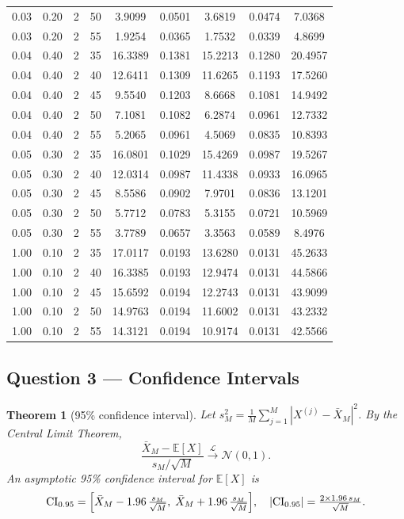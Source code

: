 \documentclass[11pt,a4paper]{article}
\theoremstyle{plain}
\newtheorem{theorem}{Theorem}[section]
\theoremstyle{definition}
\newcommand{\E}{\mathbb{E}}
\begin{document}
\begin{table}[H]
\begin{tabular}{cccc|cc|cc|c}
    0.03 & 0.20 & 2 & 50 &  3.9099 & 0.0501 &  3.6819 & 0.0474 &  7.0368 \\
    0.03 & 0.20 & 2 & 55 &  1.9254 & 0.0365 &  1.7532 & 0.0339 &  4.8699 \\
    \midrule
    0.04 & 0.40 & 2 & 35 & 16.3389 & 0.1381 & 15.2213 & 0.1280 & 20.4957 \\
    0.04 & 0.40 & 2 & 40 & 12.6411 & 0.1309 & 11.6265 & 0.1193 & 17.5260 \\
    0.04 & 0.40 & 2 & 45 &  9.5540 & 0.1203 &  8.6668 & 0.1081 & 14.9492 \\
    0.04 & 0.40 & 2 & 50 &  7.1081 & 0.1082 &  6.2874 & 0.0961 & 12.7332 \\
    0.04 & 0.40 & 2 & 55 &  5.2065 & 0.0961 &  4.5069 & 0.0835 & 10.8393 \\
    \midrule
    0.05 & 0.30 & 2 & 35 & 16.0801 & 0.1029 & 15.4269 & 0.0987 & 19.5267 \\
    0.05 & 0.30 & 2 & 40 & 12.0314 & 0.0987 & 11.4338 & 0.0933 & 16.0965 \\
    0.05 & 0.30 & 2 & 45 &  8.5586 & 0.0902 &  7.9701 & 0.0836 & 13.1201 \\
    0.05 & 0.30 & 2 & 50 &  5.7712 & 0.0783 &  5.3155 & 0.0721 & 10.5969 \\
    0.05 & 0.30 & 2 & 55 &  3.7789 & 0.0657 &  3.3563 & 0.0589 &  8.4976 \\
    \midrule
    1.00 & 0.10 & 2 & 35 & 17.0117 & 0.0193 & 13.6280 & 0.0131 & 45.2633 \\
    1.00 & 0.10 & 2 & 40 & 16.3385 & 0.0193 & 12.9474 & 0.0131 & 44.5866 \\
    1.00 & 0.10 & 2 & 45 & 15.6592 & 0.0194 & 12.2743 & 0.0131 & 43.9099 \\
    1.00 & 0.10 & 2 & 50 & 14.9763 & 0.0194 & 11.6002 & 0.0131 & 43.2332 \\
    1.00 & 0.10 & 2 & 55 & 14.3121 & 0.0194 & 10.9174 & 0.0131 & 42.5566 \\
    \bottomrule
  \end{tabular}
\end{table}

\subsection{Question 3 --- Confidence Intervals}
\label{subsec:q3}

\begin{theorem}[95\% confidence interval]
\label{thm:ci}
Let $s_M^2 = \frac{1}{M}\sum_{j=1}^M |X^{(j)}-\bar{X}_M|^2$.
By the Central Limit Theorem,
\[
  \frac{\bar{X}_M - \E[X]}{s_M/\sqrt{M}} \xrightarrow{\mathcal{L}}
  \mathcal{N}(0,1).
\]
An asymptotic 95\% confidence interval for $\E[X]$ is
\begin{equation}
  \mathrm{CI}_{0.95} =
  \Bigl[\bar{X}_M - 1.96\,\tfrac{s_M}{\sqrt{M}},\;
        \bar{X}_M + 1.96\,\tfrac{s_M}{\sqrt{M}}\Bigr],
  \quad |\mathrm{CI}_{0.95}| = \tfrac{2\times1.96\,s_M}{\sqrt{M}}.
\end{equation}
\end{theorem}
\end{document}
